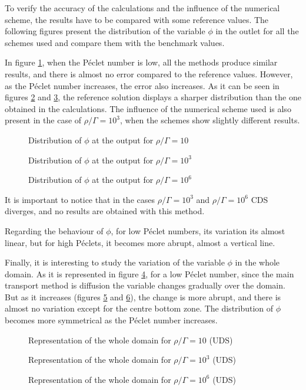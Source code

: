 To verify the accuracy of the calculations and the influence of the numerical scheme, the results have to be compared with some reference values. The following figures present the distribution of the variable $\phi$ in the outlet for all the schemes used and compare them with the benchmark values.

In figure \ref{ResSH10}, when the Péclet number is low, all the methods produce similar results, and there is almost no error compared to the reference values. However, as the Péclet number increases, the error also increases. As it can be seen in figures \ref{ResSH1000} and \ref{ResSH1000000}, the reference solution displays a sharper distribution than the one obtained in the calculations. The influence of the numerical scheme used is also present in the case of $\rho/\Gamma=10^{3}$, when the schemes show slightly different results.

\begin{figure}[h]
	\centering
	
	\caption{Distribution of $\phi$ at the output for $\rho/\Gamma=10$}
	\label{ResSH10}
\end{figure}
\begin{figure}[h]
	\centering
	
	\caption{Distribution of $\phi$ at the output for $\rho/\Gamma=10^{3}$}
	\label{ResSH1000}
\end{figure}
\begin{figure}[h!]
	\centering
	
	\caption{Distribution of $\phi$ at the output for $\rho/\Gamma=10^{6}$}
	\label{ResSH1000000}
\end{figure}
It is important to notice that in the cases $\rho/\Gamma=10^{3}$ and $\rho/\Gamma=10^{6}$ CDS diverges, and no results are obtained with this method.

Regarding the behaviour of $\phi$, for low Péclet numbers, its variation its almost linear, but for high Péclets, it becomes more abrupt, almost a vertical line.

Finally, it is interesting to study the variation of the variable $\phi$ in the whole domain. As it is represented in figure \ref{ResuSH10}, for a low Péclet number, since the main transport method is diffusion the variable changes gradually over the domain. But as it increases (figures \ref{ResuSH1000} and \ref{ResuSH1000000}), the change is more abrupt, and there is almost no variation except for the centre bottom zone. The distribution of $\phi$ becomes more symmetrical as the Péclet number increases.

\begin{figure}[h]
	\centering
	
	\caption{Representation of the whole domain for $\rho/\Gamma=10$ (UDS)}
	\label{ResuSH10}
\end{figure}
\begin{figure}[h!]
	\centering
	
	\caption{Representation of the whole domain for $\rho/\Gamma=10^{3}$ (UDS)}
	\label{ResuSH1000}
\end{figure}
\begin{figure}[h]
	\centering
	
	\caption{Representation of the whole domain for $\rho/\Gamma=10^{6}$ (UDS)}
	\label{ResuSH1000000}
\end{figure}

